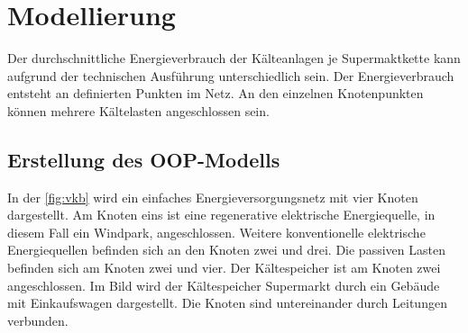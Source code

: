\chapter{Modellierung}
\label{chap:SEVN}
\minitoc

Der durchschnittliche Energieverbrauch der Kälteanlagen je Supermaktkette
kann aufgrund der technischen Ausführung unterschiedlich sein. Der
Energieverbrauch entsteht an definierten Punkten im Netz. An den einzelnen
Knotenpunkten können mehrere Kältelasten angeschlossen sein.


\section{Erstellung des OOP-Modells}

In der \cref{fig:vkb} wird ein einfaches Energieversorgungsnetz mit vier Knoten
dargestellt. Am Knoten eins ist eine regenerative elektrische Energiequelle, in
diesem Fall ein Windpark, angeschlossen. Weitere konventionelle elektrische
Energiequellen befinden sich an den Knoten zwei und drei. Die passiven Lasten
befinden sich am Knoten zwei und vier. Der Kältespeicher ist am Knoten zwei
angeschlossen. Im Bild wird der Kältespeicher Supermarkt durch ein Geb\"aude
mit Einkaufswagen dargestellt. Die Knoten sind untereinander durch Leitungen
verbunden.

